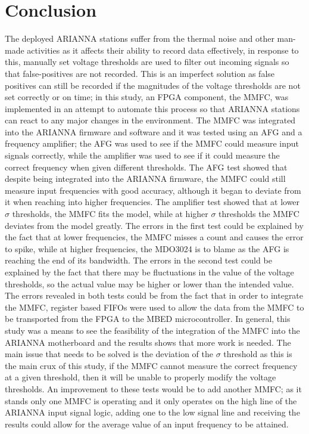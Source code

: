 \documentclass[journal]{IEEEtran}
\begin{document}
\section{Conclusion}
The deployed ARIANNA stations suffer from the thermal noise and other man-made activities as it affects their ability to record data effectively, in response to this, manually set voltage thresholds are used to filter out incoming signals so that false-positives are not recorded.  This is an imperfect solution as false positives can still be recorded if the magnitudes of the voltage thresholds are not set correctly or on time; in this study, an FPGA component, the MMFC, was implemented in an attempt to automate this process so that ARIANNA stations can react to any major changes in the environment.  The MMFC was integrated into the ARIANNA firmware and software and it was tested using an AFG and a frequency amplifier; the AFG was used to see if the MMFC could measure input signals correctly, while the amplifier was used to see if it could measure the correct frequency when given different thresholds.  The AFG test showed that despite being integrated into the ARIANNA firmware, the MMFC could still measure input frequencies with good accuracy, although it began to deviate from it when reaching into higher frequencies.  The amplifier test showed that at lower $\sigma$ thresholds, the MMFC fits the model, while at higher $\sigma$ thresholds the MMFC deviates from the model greatly.  The errors in the first test could be explained by the fact that at lower frequencies, the MMFC misses a count and causes the error to spike, while at higher frequencies, the MDO3024 is to blame as the AFG is reaching the end of its bandwidth.  The errors in the second test could be explained by the fact that there may be fluctuations in the value of the voltage thresholds, so the actual value may be higher or lower than the intended value.  The errors revealed in both tests could be from the fact that in order to integrate the MMFC, register based FIFOs were used to allow the data from the MMFC to be transported from the FPGA to the MBED microcontroller.  In general, this study was a means to see the feasibility of the integration of the MMFC into the ARIANNA motherboard and the results shows that more work is needed.  The main issue that needs to be solved is the deviation of the $\sigma$ threshold as this is the main crux of this study, if the MMFC cannot measure the correct frequency at a given threshold, then it will be unable to properly modify the voltage thresholds.  An improvement to these tests would be to add another MMFC; as it stands only one MMFC is operating and it only operates on the high line of the ARIANNA input signal logic, adding one to the low signal line and receiving the results could allow for the average value of an input frequency to be attained.  
\end{document}
